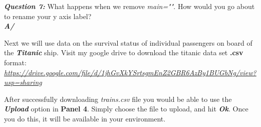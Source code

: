 \documentclass[]{article}
\newenvironment{Shaded}{\begin{snugshade}}{\end{snugshade}}
\newcommand{\CommentTok}[1]{\textcolor[rgb]{0.56,0.35,0.01}{\textit{#1}}}
\newcommand{\DataTypeTok}[1]{\textcolor[rgb]{0.13,0.29,0.53}{#1}}
\newcommand{\DecValTok}[1]{\textcolor[rgb]{0.00,0.00,0.81}{#1}}
\newcommand{\KeywordTok}[1]{\textcolor[rgb]{0.13,0.29,0.53}{\textbf{#1}}}
\newcommand{\NormalTok}[1]{#1}
\newcommand{\OperatorTok}[1]{\textcolor[rgb]{0.81,0.36,0.00}{\textbf{#1}}}
\newcommand{\OtherTok}[1]{\textcolor[rgb]{0.56,0.35,0.01}{#1}}
\newcommand{\StringTok}[1]{\textcolor[rgb]{0.31,0.60,0.02}{#1}}
\begin{document}
\begin{Shaded}
\end{Shaded}

\textbf{\emph{Question 7:}} What happens when we remove \emph{main=""}.
How would you go about to rename your y axis label?\\
\textbf{\emph{A/}}

Next we will use data on the survival status of individual passengers on
board of the \textbf{\emph{Titanic}} ship. Visit my google drive to
download the titanic data set \textbf{.csv} format:
\emph{\url{https://drive.google.com/file/d/1jhGvXkYSrtsgmEnZ2GBR6AzBy1BUGbNg/view?usp=sharing}}

After successfully downloading \emph{trains.csv} file you would be able
to use the \textbf{\emph{Upload}} option in \textbf{Panel 4}. Simply
choose the file to upload, and hit \textbf{\emph{Ok}}. Once you do this,
it will be available in your environment.
\end{document}
